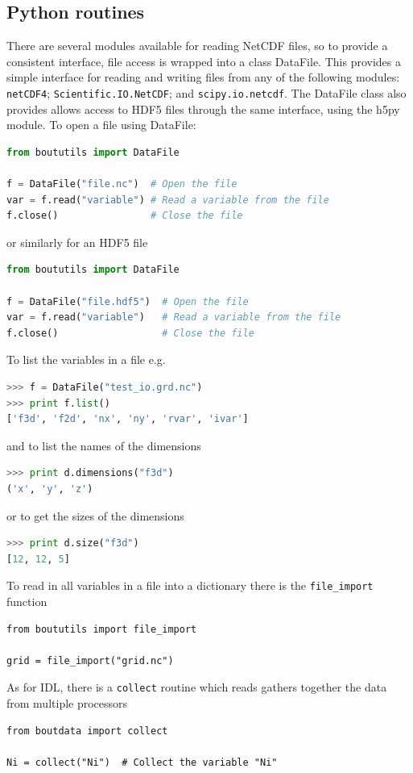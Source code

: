 \documentclass[12pt]{article}
\begin{document}
\subsection{Python routines}
%
\label{sec:pythonroutines}
%
%
There are several modules available for reading NetCDF files, so to provide a
consistent interface, file access is wrapped into a class DataFile. This
provides a simple interface for reading and writing files from any of the
following modules: \texttt{netCDF4}; \texttt{Scientific.IO.NetCDF}; and
\texttt{scipy.io.netcdf}. The DataFile class also provides allows access to
HDF5 files through the same interface, using the h5py module.  To open a file
using DataFile:
%
\begin{lstlisting}[language=python,numbers=none]
from boututils import DataFile

f = DataFile("file.nc")  # Open the file
var = f.read("variable") # Read a variable from the file
f.close()                # Close the file
\end{lstlisting}
%
or similarly for an HDF5 file
%
\begin{lstlisting}[language=python,numbers=none]
from boututils import DataFile

f = DataFile("file.hdf5")  # Open the file
var = f.read("variable")   # Read a variable from the file
f.close()                  # Close the file
\end{lstlisting}


To list the variables in a file e.g.
%
\begin{lstlisting}[language=python,numbers=none]
>>> f = DataFile("test_io.grd.nc")
>>> print f.list()
['f3d', 'f2d', 'nx', 'ny', 'rvar', 'ivar']
\end{lstlisting}
%
and to list the names of the dimensions
%
\begin{lstlisting}[language=python,numbers=none]
>>> print d.dimensions("f3d")
('x', 'y', 'z')
\end{lstlisting}
%
or to get the sizes of the dimensions
%
\begin{lstlisting}[language=python,numbers=none]
>>> print d.size("f3d")
[12, 12, 5]
\end{lstlisting}
%
To read in all variables in a file into a dictionary there is the
\texttt{file\_import} function
%
\begin{lstlisting}
from boututils import file_import

grid = file_import("grid.nc")
\end{lstlisting}
%
As for IDL, there is a \texttt{collect} routine which reads gathers together
the data from multiple processors
%
\begin{lstlisting}
from boutdata import collect

Ni = collect("Ni")  # Collect the variable "Ni"
\end{lstlisting}
%
\end{document}
